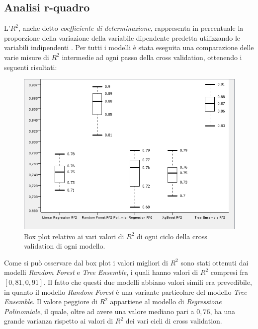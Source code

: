 \documentclass[12pt, a4paper, twocolumn]{article} %
\begin{document}
\subsection{Analisi r-quadro}
L'$R^{2}$, anche detto \textit{coefficiente di determinazione}, rappresenta in percentuale la proporzione della variazione della variabile dipendente predetta utilizzando le variabili indipendenti \cite{R-Quadro}.
Per tutti i modelli è stata eseguita una comparazione delle varie misure di $R^{2}$ intermedie ad ogni passo della cross validation, ottenendo i seguenti risultati:
\begin{figure}[H]
  \includegraphics[scale=0.5]{./Immagini/boxplot-r2.png}
  \caption{Box plot relativo ai vari valori di $R^{2}$ di ogni ciclo della cross validation di ogni modello.}
\end{figure}
Come si può osservare dal box plot i valori migliori di $R^{2}$ sono stati ottenuti dai modelli \textit{Random Forest} e \textit{Tree Ensemble}, i quali hanno valori di $R^{2}$ compresi fra $[0,81, 0,91]$. Il fatto che questi due modelli abbiano valori simili era prevedibile, in quanto il modello \textit{Random Forest} è una variante particolare del modello \textit{Tree Ensemble}. Il valore peggiore di $R^{2}$ appartiene al modello di \textit{Regressione Polinomiale}, il quale, oltre ad avere una valore mediano pari a $0,76$, ha una grande varianza rispetto ai valori di $R^{2}$ dei vari cicli di cross validation. 
\end{document}

